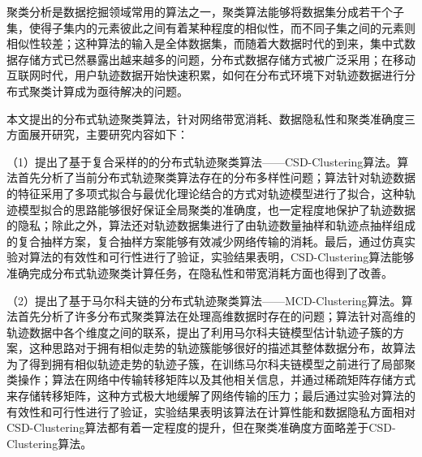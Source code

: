 	
\begin{chineseabstract}
聚类分析是数据挖掘领域常用的算法之一，聚类算法能够将数据集分成若干个子集，使得子集内的元素彼此之间有着某种程度的相似性，而不同子集之间的元素则相似性较差；这种算法的输入是全体数据集，而随着大数据时代的到来，集中式数据存储方式已然暴露出越来越多的问题，分布式数据存储方式被广泛采用；在移动互联网时代，用户轨迹数据开始快速积累，如何在分布式环境下对轨迹数据进行分布式聚类计算成为亟待解决的问题。

本文提出的分布式轨迹聚类算法，针对网络带宽消耗、数据隐私性和聚类准确度三方面展开研究，主要研究内容如下：

（1）提出了基于复合采样的的分布式轨迹聚类算法——CSD-Clustering算法。算法首先分析了当前分布式轨迹聚类算法存在的分布多样性问题；算法针对轨迹数据的特征采用了多项式拟合与最优化理论结合的方式对轨迹模型进行了拟合，这种轨迹模型拟合的思路能够很好保证全局聚类的准确度，也一定程度地保护了轨迹数据的隐私；除此之外，算法还对轨迹数据集进行了由轨迹数量抽样和轨迹点抽样组成的复合抽样方案，复合抽样方案能够有效减少网络传输的消耗。最后，通过仿真实验对算法的有效性和可行性进行了验证，实验结果表明，CSD-Clustering算法能够准确完成分布式轨迹聚类计算任务，在隐私性和带宽消耗方面也得到了改善。

（2）提出了基于马尔科夫链的分布式轨迹聚类算法——MCD-Clustering算法。算法首先分析了许多分布式聚类算法在处理高维数据时存在的问题；算法针对高维的轨迹数据中各个维度之间的联系，提出了利用马尔科夫链模型估计轨迹子簇的方案，这种思路对于拥有相似走势的轨迹簇能够很好的描述其整体数据分布，故算法为了得到拥有相似轨迹走势的轨迹子簇，在训练马尔科夫链模型之前进行了局部聚类操作；算法在网络中传输转移矩阵以及其他相关信息，并通过稀疏矩阵存储方式来存储转移矩阵，这种方式极大地缓解了网络传输的压力；最后通过实验对算法的有效性和可行性进行了验证，实验结果表明该算法在计算性能和数据隐私方面相对CSD-Clustering算法都有着一定程度的提升，但在聚类准确度方面略差于CSD-Clustering算法。

\end{chineseabstract}

